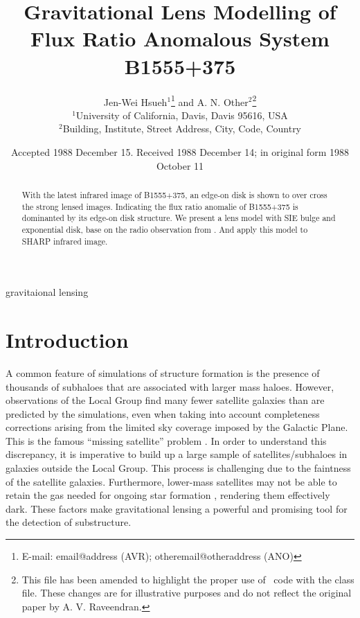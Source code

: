 \documentclass[usenatbib]{mn2e}
\title[Beware the Effect of Edge-on Disks]{Gravitational Lens Modelling of Flux Ratio Anomalous System B1555+375}
\author[Hsueh et al.]{Jen-Wei Hsueh$^{1}$\thanks{E-mail:
email@address (AVR); otheremail@otheraddress (ANO)} and A. N.
Other$^{2}$\footnotemark[1]\thanks{This file has been amended to
highlight the proper use of \LaTeXe\ code with the class file.
These changes are for illustrative purposes and do not reflect the
original paper by A. V. Raveendran.}\\
$^{1}$University of California, Davis, Davis 95616, USA\\
$^{2}$Building, Institute, Street Address, City, Code, Country}
\begin{document}
\date{Accepted 1988 December 15. Received 1988 December 14; in original form 1988 October 11}

\pagerange{\pageref{firstpage}--\pageref{lastpage}} 

\maketitle

\label{firstpage}

\begin{abstract}
With the latest infrared image of B1555+375, an edge-on disk is shown to over cross the strong lensed images. Indicating the flux ratio anomalie of B1555+375 is dominanted by its edge-on disk structure. We present a lens model with SIE bulge and exponential disk, base on the radio observation from \citet{Marlow}. And apply this model to SHARP infrared image.
\end{abstract}

\begin{keywords}
gravitaional lensing
\end{keywords}

\section{Introduction}

	A common feature of simulations of structure formation is the presence
of thousands of subhaloes that are associated with larger mass haloes.
However, observations of the Local Group find many fewer satellite
galaxies than are predicted by the simulations, even when taking into
account completeness corrections arising from the limited sky coverage
imposed by the Galactic Plane.  This is the famous ``missing
satellite'' problem \citep{Klypin1999, Moore1999, S07}. In order to understand
this discrepancy, it is imperative to build up a large sample of satellites/subhaloes in galaxies outside the Local Group.  
This process is challenging
due to the faintness of the satellite galaxies.  Furthermore, lower-mass
satellites may not be able to retain the gas needed for ongoing star
formation \citep[e.g.,][]{P11}, rendering them effectively dark.
These factors make gravitational lensing a powerful and promising tool for the detection of substructure.
\end{document}
